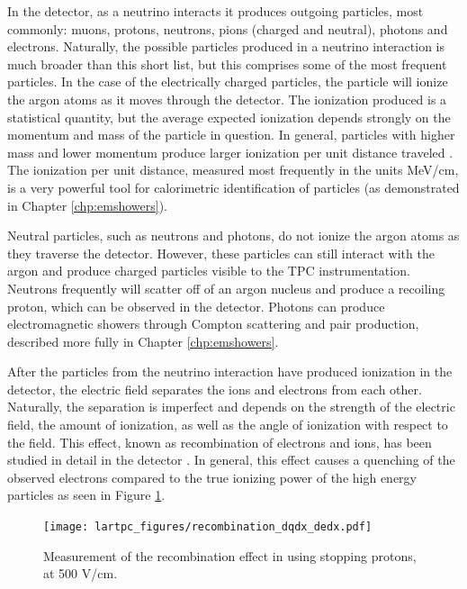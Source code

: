 In the detector, as a neutrino interacts it produces outgoing particles, most commonly: muons, protons, neutrons, pions (charged and neutral), photons and electrons.  Naturally, the possible particles produced in a neutrino interaction is much broader than this short list, but this comprises some of the most frequent particles.  In the case of the electrically charged particles, the particle will ionize the argon atoms as it moves through the detector.  The ionization produced is a statistical quantity, but the average expected ionization depends strongly on the momentum and mass of the particle in question.  In general, particles with higher mass and lower momentum produce larger ionization per unit distance traveled \cite{Kalinovsky:1989kk}.  The ionization per unit distance, measured most frequently in the units MeV/cm, is a very powerful tool for calorimetric identification of particles (as demonstrated in Chapter \ref{chp:emshowers}).

Neutral particles, such as neutrons and photons, do not ionize the argon atoms as they traverse the detector.  However, these particles can still interact with the argon and produce charged particles visible to the TPC instrumentation.  Neutrons frequently will scatter off of an argon nucleus and produce a recoiling proton, which can be observed in the detector.  Photons can produce electromagnetic showers through Compton scattering and pair production, described more fully in Chapter \ref{chp:emshowers}.

After the particles from the neutrino interaction have produced ionization in the detector, the electric field separates the ions and electrons from each other.  Naturally, the separation is imperfect and depends on the strength of the electric field, the amount of ionization, as well as the angle of ionization with respect to the field.  This effect, known as recombination of electrons and ions, has been studied in detail in the \argoneut detector \cite{Acciarri:2013met}.  In general, this effect causes a quenching of the observed electrons compared to the true ionizing power of the high energy particles as seen in Figure \ref{fig:argoneut_recombination}.

\begin{figure}[htbp]
  \centering
  \texttt{[image: lartpc\_figures/recombination\_dqdx\_dedx.pdf]}
  \caption[\argoneut Recombination]{Measurement of the recombination effect in \argoneut using stopping protons, at 500 V/cm. \cite{Acciarri:2013met}}
  \label{fig:argoneut_recombination}
\end{figure}

